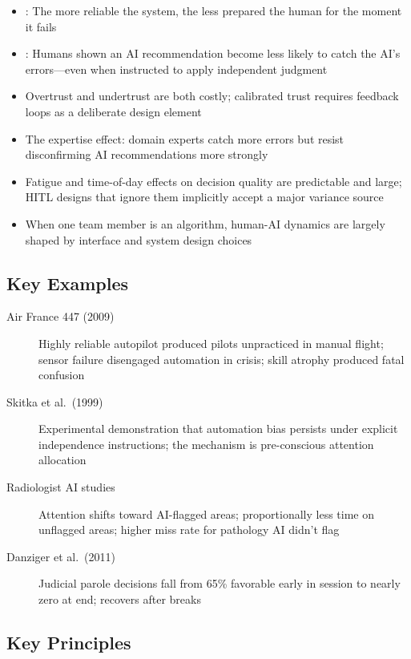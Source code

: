 \begin{keyconcept}
\begin{itemize}
    \item {}: The more reliable the system, the less prepared the human for the moment it fails
    \item {}: Humans shown an AI recommendation become less likely to catch the AI's errors---even when instructed to apply independent judgment
    \item Overtrust and undertrust are both costly; calibrated trust requires feedback loops as a deliberate design element
    \item The expertise effect: domain experts catch more errors but resist disconfirming AI recommendations more strongly
    \item Fatigue and time-of-day effects on decision quality are predictable and large; HITL designs that ignore them implicitly accept a major variance source
    \item When one team member is an algorithm, human-AI dynamics are largely shaped by interface and system design choices
\end{itemize}
\end{keyconcept}

\subsection*{Key Examples}

\begin{description}
    \item[Air France 447 (2009)] Highly reliable autopilot produced pilots unpracticed in manual flight; sensor failure disengaged automation in crisis; skill atrophy produced fatal confusion
    \item[Skitka et al.\ (1999)] Experimental demonstration that automation bias persists under explicit independence instructions; the mechanism is pre-conscious attention allocation
    \item[Radiologist AI studies] Attention shifts toward AI-flagged areas; proportionally less time on unflagged areas; higher miss rate for pathology AI didn't flag
    \item[Danziger et al.\ (2011)] Judicial parole decisions fall from 65\% favorable early in session to nearly zero at end; recovers after breaks
\end{description}

\subsection*{Key Principles}

